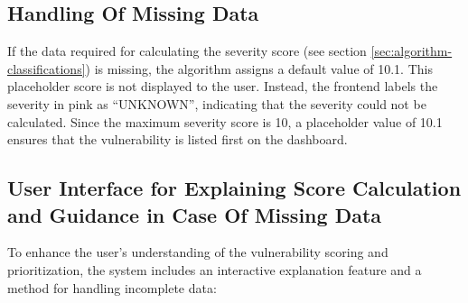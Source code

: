 \subsection{Handling Of Missing Data}
\label{subsec:handling-missing-data}

If the data required for calculating the severity score (see section \ref{sec:algorithm-classifications}) is missing, the algorithm assigns a default value of 10.1. This placeholder score is not displayed to the user. Instead, the frontend labels the severity in pink as “UNKNOWN”, indicating that the severity could not be calculated. Since the maximum severity score is 10, a placeholder value of 10.1 ensures that the vulnerability is listed first on the dashboard.

\subsection{User Interface for Explaining Score Calculation and Guidance in Case Of Missing Data}
\label{subsec:ui-explaining-score}

To enhance the user’s understanding of the vulnerability scoring and prioritization, the system includes an interactive explanation feature and a method for handling incomplete data:

